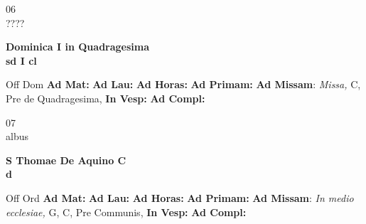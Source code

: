 \documentclass[10pt, openany]{book}
\begin{document}
    \begin{center}
        \begin{minipage}{3.5in}
            \vspace{2em}
            \begin{minipage}{0.5in}
                {\Huge 06} \\
                {\normalsize ????}
            \end{minipage}
            \begin{minipage}{3.0in}
                \textbf{ \large Dominica I in Quadragesima \\
                \textnormal{\normalsize sd I cl}}

            \end{minipage}
            \begin{justify}Off Dom
                \textbf{Ad Mat: }
                \textbf{Ad Lau: }
                \textbf{Ad Horas: }
                \textbf{Ad Primam: }\textbf{Ad Missam}: \textit{Missa,} C, Pre de Quadragesima, 
                \textbf{In Vesp: }
                \textbf{Ad Compl: }
            \end{justify}
        \end{minipage}
    \end{center}

    \begin{center}
        \begin{minipage}{3.5in}
            \vspace{2em}
            \begin{minipage}{0.5in}
                {\Huge 07} \\
                {\normalsize albus}
            \end{minipage}
            \begin{minipage}{3.0in}
                \textbf{ \large S Thomae De Aquino C \\
                \textnormal{\normalsize d}}

            \end{minipage}
            \begin{justify}Off Ord
                \textbf{Ad Mat: }
                \textbf{Ad Lau: }
                \textbf{Ad Horas: }
                \textbf{Ad Primam: }\textbf{Ad Missam}: \textit{In medio ecclesiae,} G, C, Pre Communis, 
                \textbf{In Vesp: }
                \textbf{Ad Compl: }
            \end{justify}
        \end{minipage}
    \end{center}
\end{document}
